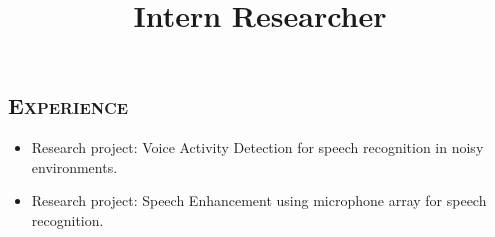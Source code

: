 \begin{resume}
\vspace*{-4pt}
\section{\textsc{Experience}}

\title{Intern Researcher}
\begin{position}
\vspace*{-8pt}
\begin{itemize}
\item Research project: Voice Activity Detection for speech recognition in noisy environments.
\vspace*{-4pt}
\item Research project: Speech Enhancement using microphone array for speech recognition.
\end{itemize} 
\end{position}





\end{resume}
